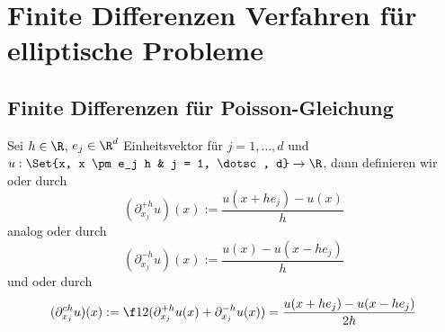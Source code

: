 \chapter{Finite Differenzen Verfahren für elliptische Probleme} \label{chap:2}



\section{Finite Differenzen für Poisson-Gleichung}


\begin{df} \label{2.1}
	Sei $h \in \R$, $e_j \in \R^d$ Einheitsvektor für $j = 1, \dotsc, d$ und $u: \Set{x, x \pm e_j h & j = 1, \dotsc, d} \to \R$, dann definieren wir  oder  durch
	\[
		(\partial_{x_j}^{+h}u)(x) := \frac{u(x+he_j) -u(x)}{h}
	\]
	analog  oder  durch
	\[
		(\partial_{x_j}^{-h}u)(x) := \frac{u(x) - u(x-he_j)}{h}
	\]
	und  oder  durch
	\[
		(\partial_{x_j}^{ch} u)(x)
		:= \f 12 (\partial_{x_j}^{+h} u(x) + \partial_{x_j}^{-h} u(x))
		= \frac{u(x+he_j) - u(x-he_j)}{2h}
	\]
\end{df}


